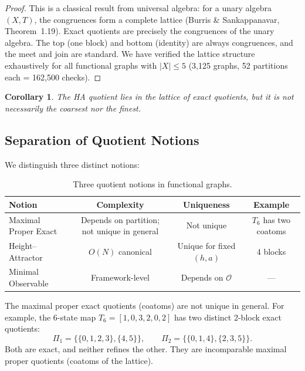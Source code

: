 \documentclass[11pt, a4paper]{article}
\newtheorem{corollary}[theorem]{Corollary}
\theoremstyle{definition}
\theoremstyle{remark}
\begin{document}
\begin{proof}
This is a classical result from universal algebra: for a unary algebra \((X, T)\), the congruences form a complete lattice (Burris \& Sankappanavar, Theorem~1.19). Exact quotients are precisely the congruences of the unary algebra. The top (one block) and bottom (identity) are always congruences, and the meet and join are standard. We have verified the lattice structure exhaustively for all functional graphs with \(|X| \le 5\) (3,125 graphs, 52 partitions each = 162,500 checks).
\end{proof}

\begin{corollary}
The HA quotient lies in the lattice of exact quotients, but it is not necessarily the coarsest nor the finest.
\end{corollary}

\subsection{Separation of Quotient Notions}

We distinguish three distinct notions:

\begin{table}[h]
\centering
\begin{tabular}{lccc}
\toprule
\textbf{Notion} & \textbf{Complexity} & \textbf{Uniqueness} & \textbf{Example} \\
\midrule
Maximal Proper Exact & Depends on partition; not unique in general & Not unique & \(T_6\) has two coatoms \\
Height–Attractor & \(O(N)\) canonical & Unique for fixed \((h,a)\) & 4 blocks \\
Minimal Observable & Framework-level & Depends on \(\mathcal O\) & — \\
\bottomrule
\end{tabular}
\caption{Three quotient notions in functional graphs.}
\end{table}

The maximal proper exact quotients (coatoms) are not unique in general. For example, the 6-state map \(T_6 = [1,0,3,2,0,2]\) has two distinct 2-block exact quotients:
\[
\Pi_1 = \{\{0,1,2,3\}, \{4,5\}\}, \qquad
\Pi_2 = \{\{0,1,4\}, \{2,3,5\}\}.
\]
Both are exact, and neither refines the other. They are incomparable maximal proper quotients (coatoms of the lattice).
\end{document}
